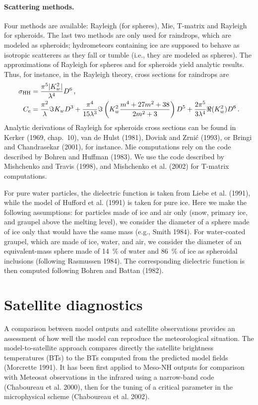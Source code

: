 \paragraph{Scattering methods.}
Four methods are available: Rayleigh (for spheres), Mie, T-matrix and Rayleigh for spheroids. The last two methods are only used for raindrops, which are modeled as spheroids; hydrometeors containing ice are supposed to behave as isotropic scatterers as they fall or tumble (i.e., they are modeled as spheres).
The approximations of Rayleigh for spheres and for spheroids yield analytic results. Thus, for instance, in the Rayleigh theory, cross sections for raindrops are
\begin{align}
\sigma_{\rm HH}&=\frac{\pi^5|K_w^2|}{\lambda^4}D^6\,,\\
C_e&=\frac{\pi^2}\lambda\Im K_wD^3+\frac{\pi^4}{15\lambda^3}\Im\left(K_w^2\frac{m^4+27m^2+38}{2m^2+3}\right)D^5+\frac{2\pi^5}{3\lambda^4}\Re(K_w^2)D^6\,.
\end{align}
Analytic derivations of Rayleigh for spheroids cross sections can be found in Kerker (1969, chap.~10), van de Hulst (1981), Doviak and Zrni\'c (1993), or Bringi and Chandrasekar (2001), for instance.
Mie computations rely on the code described by Bohren and Huffman (1983). We use the code described by Mishchenko and Travis (1998), and Mishchenko et al. (2002) for T-matrix computations.

For pure water particles, the dielectric function is taken from Liebe et al. (1991), while the model of Hufford et al. (1991) is taken for pure ice.  Here we make the following assumptions: for particles made of ice and air only (snow, primary ice, and graupel above the melting level), we consider the diameter of a sphere made of ice only that would have the same mass (e.g., Smith 1984). For water-coated graupel, which are made of ice, water, and air, we consider the diameter of an equivalent-mass sphere made of 14~\% of water and 86~\% of ice as spheroidal inclusions (following Rasmussen 1984). The corresponding dielectric function is then computed following Bohren and Battan (1982).

\section{Satellite diagnostics}
A comparison between model outputs and satellite observations provides an assessment of how well the model can reproduce the meteorological situation.
 The model-to-satellite approach compares directly the satellite brightness temperatures (BTs) to the BTs computed from the predicted model fields 
(Morcrette 1991). It has been first applied to Meso-NH outputs for comparison
 with Meteosat observations in the infrared using a narrow-band code 
(Chaboureau et al. 2000), then for the tuning of a critical parameter in the microphysical scheme (Chaboureau et al. 2002).

